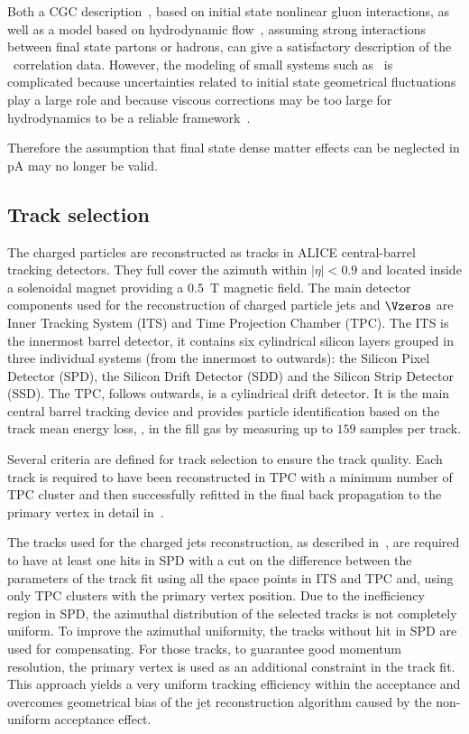 Both a CGC
description~\cite{Dusling:2013oia}, based on initial state nonlinear
gluon interactions, as well as a model based on hydrodynamic
flow~\cite{Bozek:2012gr,Qin:2013bha}, assuming strong interactions
between final state partons or hadrons, can give a satisfactory
description of the \pPb\ correlation data. However, the modeling of
small systems such as \pPb\ is complicated because uncertainties
related to initial state geometrical fluctuations play a large role
and because viscous corrections may be too large for hydrodynamics to
be a reliable framework~\cite{Bzdak:2013zma}.


Therefore the assumption that final state dense matter effects can be
neglected in pA may no longer be valid.


\subsection{Track selection}

The charged particles are reconstructed as tracks in ALICE central-barrel tracking detectors. They full cover the azimuth within $|\eta|<0.9$ and located inside a solenoidal magnet providing a $0.5$~T magnetic field.
The main detector components used for the reconstruction of charged particle
jets and $\Vzeros$ are Inner Tracking System (ITS) and
Time Projection Chamber (TPC).
The ITS is the innermost barrel detector,
it contains six cylindrical silicon layers grouped in three
individual systems (from the innermost to outwards):
the Silicon Pixel Detector (SPD),
the Silicon Drift Detector (SDD) and
the Silicon Strip Detector (SSD).
The TPC, follows outwards, is a cylindrical drift detector.
It is the main central barrel tracking device and provides
particle identification based on the track mean energy loss, \dedx,
in the fill gas by measuring up to $159$ samples per track.

Several criteria are defined for track selection to ensure the track quality.
Each track is required to have been reconstructed in TPC with a minimum
number of TPC cluster and then successfully refitted in the final back propagation
to the primary vertex in detail in~\cite{Alessandro:2006yt}.

The tracks used for the charged jets reconstruction,
as described in~\cite{Abelev:2013kqa},
are required to have at least one hits in SPD with a cut on
the difference between the parameters of the track fit using
all the space points in ITS and TPC and, using only TPC clusters
with the primary vertex position.
Due to the inefficiency region in SPD,
the azimuthal distribution of the selected tracks is not completely uniform.
To improve the azimuthal uniformity,
the tracks without hit in SPD are used for compensating.
For those tracks, to guarantee good momentum resolution,
the primary vertex is used as an additional constraint in the track fit.
This approach yields a very uniform tracking efficiency within
the acceptance and overcomes geometrical bias of the jet reconstruction
algorithm caused by the non-uniform acceptance effect.

